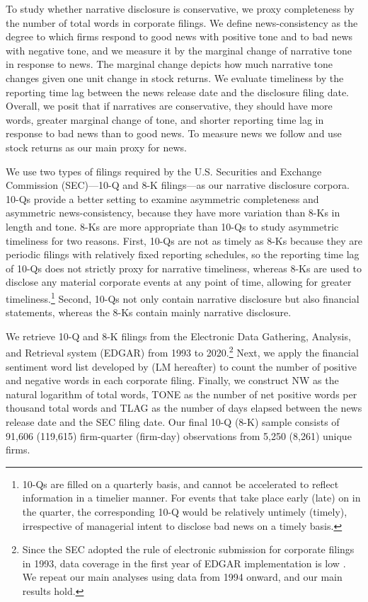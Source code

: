 \documentclass[letterpaper,12pt]{article}
\begin{document}
\begin{spacing}{1.5}
To study whether narrative disclosure is conservative, we proxy completeness by the number of total words in corporate filings. We define news-consistency as the degree to which firms respond to good news with positive tone and to bad news with negative tone, and we measure it by the marginal change of narrative tone in response to news. The marginal change depicts how much narrative tone changes given one unit change in stock returns. 
We evaluate timeliness by the reporting time lag between the news release date and the disclosure filing date. Overall, we posit that if narratives are conservative, they should have more words, greater marginal change of tone, and shorter reporting time lag in response to bad news than to good news. To measure news we follow  and use stock returns as our main proxy for news.

We use two types of filings required by the U.S. Securities and Exchange Commission (SEC)---10-Q and 8-K filings---as our narrative disclosure corpora. 10-Qs provide a better setting to examine asymmetric completeness and asymmetric news-consistency, because they have more variation than 8-Ks in length and tone. 8-Ks are more appropriate than 10-Qs to study asymmetric timeliness for two reasons. First, 10-Qs are not as timely as 8-Ks because they are periodic filings with relatively fixed reporting schedules, so the reporting time lag of 10-Qs does not strictly proxy for narrative timeliness, whereas 8-Ks are used to disclose any material corporate events at any point of time, allowing for greater timeliness.\footnote{10-Qs are filled on a quarterly basis, and cannot be accelerated to reflect information in a timelier manner. For events that take place early (late) on in the quarter, the corresponding 10-Q would be relatively untimely (timely), irrespective of managerial intent to disclose bad news on a timely basis.}  Second, 10-Qs not only contain narrative disclosure but also financial statements,  whereas the 8-Ks contain mainly narrative disclosure.

We retrieve 10-Q and 8-K filings from the Electronic Data Gathering, Analysis, and Retrieval system (EDGAR) from 1993 to 2020.\footnote{Since the SEC adopted the rule of electronic submission for corporate filings in 1993, data coverage in the first year of EDGAR implementation is low \cite{gaoInformingMarketEffect2020}. We repeat our main analyses using data from 1994 onward, and our main results hold.} Next, we apply the financial sentiment word list developed by  (LM hereafter) to count the number of positive and negative words in each corporate filing. Finally, we construct NW as the natural logarithm of total words, TONE as the number of net positive words per thousand total words and TLAG as the number of days elapsed between the news release date and the SEC filing date. Our final 10-Q (8-K) sample consists of 91,606 (119,615) firm-quarter (firm-day) observations from 5,250 (8,261) unique firms. 


\end{spacing}
\end{document}
